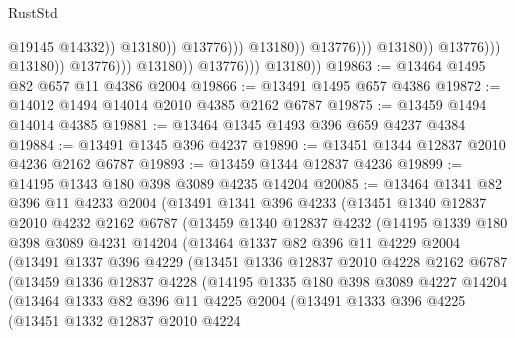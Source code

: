 \begin{lexlean}{RustStd}
\begin{coremodule}
{\begin{coremodule}
{{{{{{{{{{{{{{{{{{{{{{{{{{{{{{{                                                              @19145
                                                              @14332))
                                                          @13180))
                                                      @13776)))
                                                @13180))
                                            @13776)))
                                      @13180))
                                  @13776)))
                            @13180))
                        @13776)))
                  @13180))
              @13776)))
        @13180))
@19863 := @13464 @1495 @82 @657 @11 @4386 @2004
@19866 := @13491 @1495 @657 @4386
@19872 := @14012 @1494 @14014 @2010 @4385 @2162 @6787
@19875 := @13459 @1494 @14014 @4385
@19881 := @13464 @1345 @1493 @396 @659 @4237 @4384
@19884 := @13491 @1345 @396 @4237
@19890 := @13451 @1344 @12837 @2010 @4236 @2162 @6787
@19893 := @13459 @1344 @12837 @4236
@19899 := @14195 @1343 @180 @398 @3089 @4235 @14204
@20085 := @13464
    @1341
    @82
    @396
    @11
    @4233
    @2004
    (@13491
      @1341
      @396
      @4233
      (@13451
        @1340
        @12837
        @2010
        @4232
        @2162
        @6787
        (@13459
          @1340
          @12837
          @4232
          (@14195
            @1339
            @180
            @398
            @3089
            @4231
            @14204
            (@13464
              @1337
              @82
              @396
              @11
              @4229
              @2004
              (@13491
                @1337
                @396
                @4229
                (@13451
                  @1336
                  @12837
                  @2010
                  @4228
                  @2162
                  @6787
                  (@13459
                    @1336
                    @12837
                    @4228
                    (@14195
                      @1335
                      @180
                      @398
                      @3089
                      @4227
                      @14204
                      (@13464
                        @1333
                        @82
                        @396
                        @11
                        @4225
                        @2004
                        (@13491
                          @1333
                          @396
                          @4225
                          (@13451
                            @1332
                            @12837
                            @2010
                            @4224
}}}}}}}}}}}}}}}}}}}}}}}}}}}}}}}
\end{coremodule}}
\end{coremodule}
\end{lexlean}
